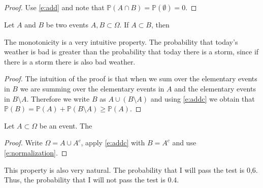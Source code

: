 	\begin{proof}
		Use \eqref{e:add} and note that $\mathbb{P}(A\cap B)= \mathbb{P}(\emptyset)= 0$. 
	\end{proof}
		\begin{corollary}[Monotonicity]
			\label{c:monotonicity}
			Let $A$ and $B$ be two events $A,B\subset\Omega$. If $A\subset B$, then 
		\end{corollary}
	The monotonicity is a very intuitive property. The probability that today's weather is bad is greater than the probability that today there is a storm, since if there is a storm there is also bad weather.  
	\begin{proof}
		The intuition of the proof is that when we sum over the elementary events in $B$ we are summing over the elementary events in $A$ and the elementary events in $B\setminus A$. Therefore we write $B$ as $A\cup (B\setminus A)$ and using \eqref{e:addc} we obtain that $\mathbb{P}(B) = \mathbb{P}(A)+\mathbb{P}(B\setminus A) \geq \mathbb{P}(A)$.
	\end{proof}
	\begin{corollary}
	 \label{c:complementary}
		Let $A\subset \Omega$ be an event. The 
	\end{corollary}
	\begin{proof}
		Write $\Omega = A \cup A^c $, apply \eqref{e:addc} with $B=A^c$ and use \eqref{e:normalization}.
	\end{proof}
	This property is also very natural. The probability that I will pass the test is 0,6. Thus, the probability that I will not pass the test is $0.4$.\\
	
